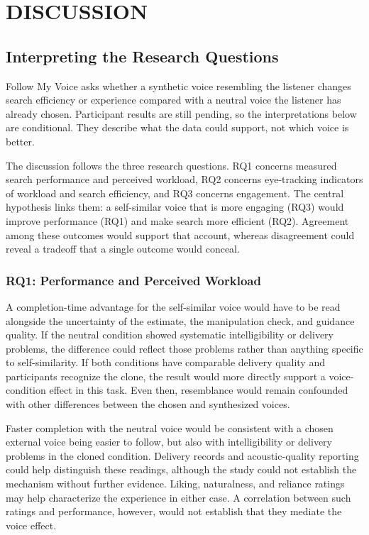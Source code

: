 \chapter{DISCUSSION}
\label{ch:discussion}
\section{Interpreting the Research Questions}
Follow My Voice asks whether a synthetic voice resembling the listener changes search efficiency or experience compared with a neutral voice the listener has already chosen. Participant results are still pending, so the interpretations below are conditional. They describe what the data could support, not which voice is better.

The discussion follows the three research questions. RQ1 concerns measured search performance and perceived workload, RQ2 concerns eye-tracking indicators of workload and search efficiency, and RQ3 concerns engagement. The central hypothesis links them: a self-similar voice that is more engaging (RQ3) would improve performance (RQ1) and make search more efficient (RQ2). Agreement among these outcomes would support that account, whereas disagreement could reveal a tradeoff that a single outcome would conceal.

\subsection{RQ1: Performance and Perceived Workload}
A completion-time advantage for the self-similar voice would have to be read alongside the uncertainty of the estimate, the manipulation check, and guidance quality. If the neutral condition showed systematic intelligibility or delivery problems, the difference could reflect those problems rather than anything specific to self-similarity. If both conditions have comparable delivery quality and participants recognize the clone, the result would more directly support a voice-condition effect in this task. Even then, resemblance would remain confounded with other differences between the chosen and synthesized voices.

Faster completion with the neutral voice would be consistent with a chosen external voice being easier to follow, but also with intelligibility or delivery problems in the cloned condition. Delivery records and acoustic-quality reporting could help distinguish these readings, although the study could not establish the mechanism without further evidence. Liking, naturalness, and reliance ratings may help characterize the experience in either case. A correlation between such ratings and performance, however, would not establish that they mediate the voice effect.

